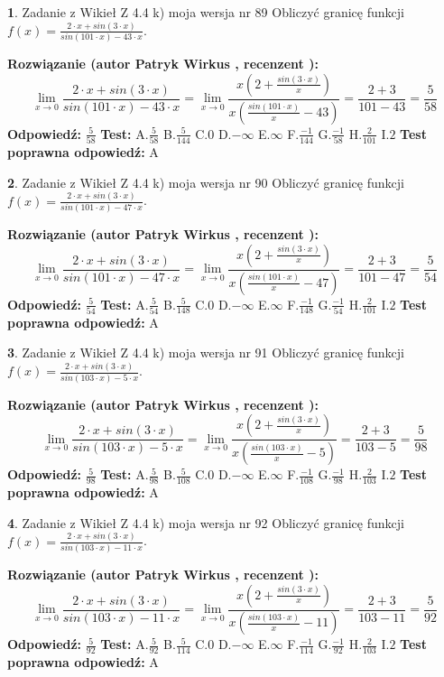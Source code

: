 \documentclass[12pt, a4paper]{article}
\theoremstyle{definition} %
\newtheorem{zad}{}
\newcommand{\zadStart}[1]{\begin{zad}#1\newline}
\newcommand{\zadStop}{\end{zad}}
\newcommand{\rozwStart}[2]{\noindent \textbf{Rozwiązanie (autor #1 , recenzent #2): }\newline}
\newcommand{\rozwStop}{\newline}
\newcommand{\odpStart}{\noindent \textbf{Odpowiedź:}\newline}
\newcommand{\odpStop}{\newline}
\newcommand{\testStart}{\noindent \textbf{Test:}\newline}
\newcommand{\testStop}{\newline}
\newcommand{\kluczStart}{\noindent \textbf{Test poprawna odpowiedź:}\newline}
\newcommand{\kluczStop}{\newline}
\begin{document}
\zadStart{Zadanie z Wikieł Z 4.4 k) moja wersja nr 89}
Obliczyć granicę funkcji $f(x)=\frac{2\cdot x +sin(3\cdot x)}{sin(101\cdot x) -43\cdot x}$.
\zadStop
\rozwStart{Patryk Wirkus}{}
$$\lim\limits_{x\to 0}\frac{2\cdot x +sin(3\cdot x)}{sin(101\cdot x) -43\cdot x}
=\lim\limits_{x\to 0}\frac{x(2+\frac{sin(3\cdot x)}{x})}{x(\frac{sin(101\cdot x)}{x}-43)}
=\frac{2+3}{101-43} = \frac{5}{58}$$
\rozwStop
\odpStart
$\frac{5}{58}$
\odpStop
\testStart
A.$\frac{5}{58}$
B.$\frac{5}{144}$
C.$0$
D.$-\infty$
E.$\infty$
F.$\frac{-1}{144}$
G.$\frac{-1}{58}$
H.$\frac{2}{101}$
I.$2$
\testStop
\kluczStart
A
\kluczStop



\zadStart{Zadanie z Wikieł Z 4.4 k) moja wersja nr 90}
Obliczyć granicę funkcji $f(x)=\frac{2\cdot x +sin(3\cdot x)}{sin(101\cdot x) -47\cdot x}$.
\zadStop
\rozwStart{Patryk Wirkus}{}
$$\lim\limits_{x\to 0}\frac{2\cdot x +sin(3\cdot x)}{sin(101\cdot x) -47\cdot x}
=\lim\limits_{x\to 0}\frac{x(2+\frac{sin(3\cdot x)}{x})}{x(\frac{sin(101\cdot x)}{x}-47)}
=\frac{2+3}{101-47} = \frac{5}{54}$$
\rozwStop
\odpStart
$\frac{5}{54}$
\odpStop
\testStart
A.$\frac{5}{54}$
B.$\frac{5}{148}$
C.$0$
D.$-\infty$
E.$\infty$
F.$\frac{-1}{148}$
G.$\frac{-1}{54}$
H.$\frac{2}{101}$
I.$2$
\testStop
\kluczStart
A
\kluczStop



\zadStart{Zadanie z Wikieł Z 4.4 k) moja wersja nr 91}
Obliczyć granicę funkcji $f(x)=\frac{2\cdot x +sin(3\cdot x)}{sin(103\cdot x) -5\cdot x}$.
\zadStop
\rozwStart{Patryk Wirkus}{}
$$\lim\limits_{x\to 0}\frac{2\cdot x +sin(3\cdot x)}{sin(103\cdot x) -5\cdot x}
=\lim\limits_{x\to 0}\frac{x(2+\frac{sin(3\cdot x)}{x})}{x(\frac{sin(103\cdot x)}{x}-5)}
=\frac{2+3}{103-5} = \frac{5}{98}$$
\rozwStop
\odpStart
$\frac{5}{98}$
\odpStop
\testStart
A.$\frac{5}{98}$
B.$\frac{5}{108}$
C.$0$
D.$-\infty$
E.$\infty$
F.$\frac{-1}{108}$
G.$\frac{-1}{98}$
H.$\frac{2}{103}$
I.$2$
\testStop
\kluczStart
A
\kluczStop



\zadStart{Zadanie z Wikieł Z 4.4 k) moja wersja nr 92}
Obliczyć granicę funkcji $f(x)=\frac{2\cdot x +sin(3\cdot x)}{sin(103\cdot x) -11\cdot x}$.
\zadStop
\rozwStart{Patryk Wirkus}{}
$$\lim\limits_{x\to 0}\frac{2\cdot x +sin(3\cdot x)}{sin(103\cdot x) -11\cdot x}
=\lim\limits_{x\to 0}\frac{x(2+\frac{sin(3\cdot x)}{x})}{x(\frac{sin(103\cdot x)}{x}-11)}
=\frac{2+3}{103-11} = \frac{5}{92}$$
\rozwStop
\odpStart
$\frac{5}{92}$
\odpStop
\testStart
A.$\frac{5}{92}$
B.$\frac{5}{114}$
C.$0$
D.$-\infty$
E.$\infty$
F.$\frac{-1}{114}$
G.$\frac{-1}{92}$
H.$\frac{2}{103}$
I.$2$
\testStop
\kluczStart
A
\kluczStop
\end{document}
